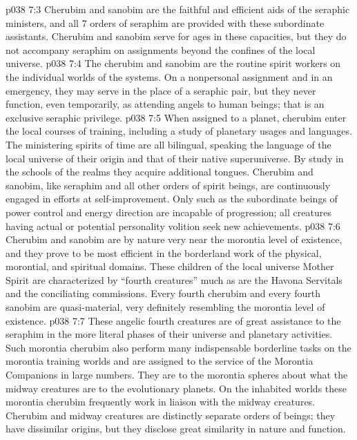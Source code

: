 \vs p038 7:3 \pc Cherubim and sanobim are the faithful and efficient aids of the seraphic ministers, and all 7 orders of seraphim are provided with these subordinate assistants. Cherubim and sanobim serve for ages in these capacities, but they do not accompany seraphim on assignments beyond the confines of the local universe.
\vs p038 7:4 The cherubim and sanobim are the routine spirit workers on the individual worlds of the systems. On a nonpersonal assignment and in an emergency, they may serve in the place of a seraphic pair, but they never function, even temporarily, as attending angels to human beings; that is an exclusive seraphic privilege.
\vs p038 7:5 \pc When assigned to a planet, cherubim enter the local courses of training, including a study of planetary usages and languages. The ministering spirits of time are all bilingual, speaking the language of the local universe of their origin and that of their native superuniverse. By study in the schools of the realms they acquire additional tongues. Cherubim and sanobim, like seraphim and all other orders of spirit beings, are continuously engaged in efforts at self\hyp{}improvement. Only such as the subordinate beings of power control and energy direction are incapable of progression; all creatures having actual or potential personality volition seek new achievements.
\vs p038 7:6 \pc Cherubim and sanobim are by nature very near the morontia level of existence, and they prove to be most efficient in the borderland work of the physical, morontial, and spiritual domains. These children of the local universe Mother Spirit are characterized by “fourth creatures” much as are the Havona Servitals and the conciliating commissions. Every fourth cherubim and every fourth sanobim are quasi\hyp{}material, very definitely resembling the morontia level of existence.
\vs p038 7:7 These angelic fourth creatures are of great assistance to the seraphim in the more literal phases of their universe and planetary activities. Such morontia cherubim also perform many indispensable borderline tasks on the morontia training worlds and are assigned to the service of the Morontia Companions in large numbers. They are to the morontia spheres about what the midway creatures are to the evolutionary planets. On the inhabited worlds these morontia cherubim frequently work in liaison with the midway creatures. Cherubim and midway creatures are distinctly separate orders of beings; they have dissimilar origins, but they disclose great similarity in nature and function.

